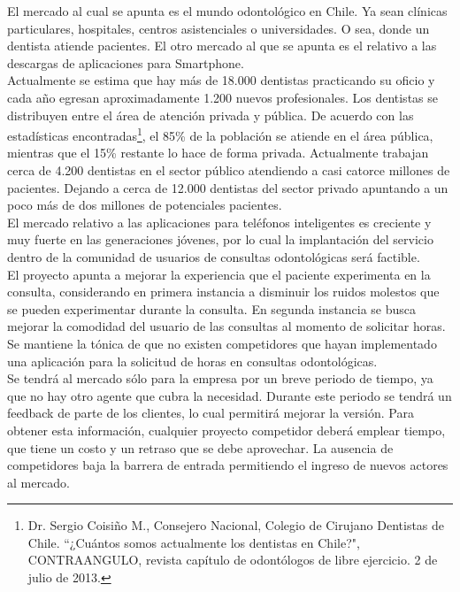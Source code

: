 \documentclass[letterpaper,12pt]{article}
\begin{document}
El mercado al cual se apunta es el mundo odontológico en Chile. Ya sean clínicas
particulares, hospitales, centros asistenciales o universidades. O sea, donde un dentista atiende 
pacientes. El otro mercado al que se apunta es el relativo a las descargas de aplicaciones para 
Smartphone.
\\[0.5cm]
\indent Actualmente se estima que hay más de 18.000 dentistas practicando su oficio y cada año 
egresan aproximadamente 1.200 nuevos profesionales. Los dentistas se distribuyen entre el área de 
atención privada y pública. De acuerdo con las estadísticas encontradas\footnote{Dr. Sergio Coisiño M., Consejero Nacional, Colegio de Cirujano Dentistas de Chile. ``¿Cuántos somos
actualmente los dentistas en Chile?", CONTRAANGULO, revista capítulo de odontólogos de libre ejercicio. 2 de julio de 2013.}, el 85\% de la población se
atiende en el área pública, mientras que el 15\% restante lo hace de forma privada. Actualmente 
trabajan cerca de 4.200 dentistas en el sector público atendiendo a casi catorce millones de 
pacientes. Dejando a cerca de 12.000 dentistas del sector privado apuntando a un poco más de dos 
millones de potenciales pacientes.
\\[0.5cm]
\indent El mercado relativo a las aplicaciones para teléfonos inteligentes es creciente y muy fuerte en las generaciones jóvenes, por lo cual la implantación del servicio dentro de la comunidad de usuarios de consultas odontológicas será factible.
\\[0.5cm]
\indent El proyecto apunta a mejorar la experiencia que el paciente experimenta en la consulta, 
considerando en primera instancia a disminuir los ruidos molestos que se pueden experimentar 
durante la consulta. En segunda instancia se busca mejorar la comodidad del usuario de las consultas al momento de solicitar horas. Se mantiene la tónica de que no existen competidores que
hayan implementado una aplicación para la solicitud de horas en consultas odontológicas.
\\[0.5cm]
\indent Se tendrá al mercado sólo para la empresa por un breve periodo de tiempo, ya que no hay 
otro agente que cubra la necesidad. Durante este periodo se tendrá un feedback de parte de los 
clientes, lo cual permitirá mejorar la versión. Para obtener esta información, cualquier proyecto 
competidor deberá emplear tiempo, que tiene un costo y un retraso que se debe aprovechar. La 
ausencia de competidores baja la barrera de entrada permitiendo el ingreso de nuevos actores al 
mercado.
\\[0.5cm]
\end{document}
